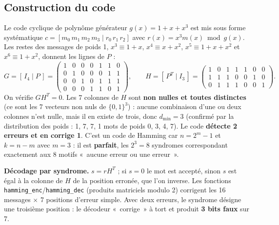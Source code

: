 \documentclass[10pt,a4paper]{article}
\newcommand{\code}[1]{\texttt{\small #1}}
\begin{document}
\subsection{Construction du code}
Le code cyclique de polynôme générateur $g(x) = 1 + x + x^3$ est mis sous forme systématique $c = [m_0\,m_1\,m_2\,m_3 \mid r_0\,r_1\,r_2]$ avec $r(x) = x^3m(x) \bmod g(x)$. Les restes des messages de poids 1, $x^3 \equiv 1+x$, $x^4 \equiv x+x^2$, $x^5 \equiv 1+x+x^2$ et $x^6 \equiv 1+x^2$, donnent les lignes de $P$ :
\[
  G = [\,I_4 \mid P\,] = \begin{pmatrix}1&0&0&0&1&1&0\\0&1&0&0&0&1&1\\0&0&1&0&1&1&1\\0&0&0&1&1&0&1\end{pmatrix},
  \qquad
  H = [\,P^T \mid I_3\,] = \begin{pmatrix}1&0&1&1&1&0&0\\1&1&1&0&0&1&0\\0&1&1&1&0&0&1\end{pmatrix}.
\]
On vérifie $GH^T = 0$. Les 7 colonnes de $H$ sont \textbf{non nulles et toutes distinctes} (ce sont les 7 vecteurs non nuls de $\{0,1\}^3$) : aucune combinaison d'une ou deux colonnes n'est nulle, mais il en existe de trois, donc $d_{\min} = 3$ (confirmé par la distribution des poids : 1, 7, 7, 1 mots de poids 0, 3, 4, 7). Le code \textbf{détecte 2 erreurs et en corrige 1}. C'est un code de Hamming car $n = 2^m - 1$ et $k = n - m$ avec $m = 3$ : il est \textbf{parfait}, les $2^3 = 8$ syndromes correspondant exactement aux 8 motifs «~aucune erreur ou une erreur~».

\textbf{Décodage par syndrome.} $s = rH^T$ ; si $s = 0$ le mot est accepté, sinon $s$ est égal à la colonne de $H$ de la position erronée, que l'on inverse. Les fonctions \code{hamming\_enc}/\code{hamming\_dec} (produits matriciels modulo 2) corrigent les 16 messages $\times$ 7 positions d'erreur simple. Avec deux erreurs, le syndrome désigne une troisième position : le décodeur «~corrige~» à tort et produit \textbf{3 bits faux} sur 7.
\end{document}
